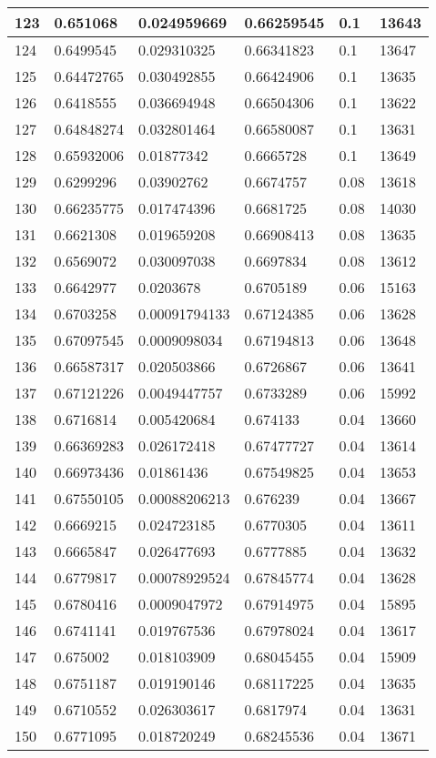 \begin{longtable}{|l|l|l|l|l|l|}
123 & 0.651068 & 0.024959669 & 0.66259545 & 0.1 & 13643 \\ \hline 
124 & 0.6499545 & 0.029310325 & 0.66341823 & 0.1 & 13647 \\ \hline 
125 & 0.64472765 & 0.030492855 & 0.66424906 & 0.1 & 13635 \\ \hline 
126 & 0.6418555 & 0.036694948 & 0.66504306 & 0.1 & 13622 \\ \hline 
127 & 0.64848274 & 0.032801464 & 0.66580087 & 0.1 & 13631 \\ \hline 
128 & 0.65932006 & 0.01877342 & 0.6665728 & 0.1 & 13649 \\ \hline 
129 & 0.6299296 & 0.03902762 & 0.6674757 & 0.08 & 13618 \\ \hline 
130 & 0.66235775 & 0.017474396 & 0.6681725 & 0.08 & 14030 \\ \hline 
131 & 0.6621308 & 0.019659208 & 0.66908413 & 0.08 & 13635 \\ \hline 
132 & 0.6569072 & 0.030097038 & 0.6697834 & 0.08 & 13612 \\ \hline 
133 & 0.6642977 & 0.0203678 & 0.6705189 & 0.06 & 15163 \\ \hline 
134 & 0.6703258 & 0.00091794133 & 0.67124385 & 0.06 & 13628 \\ \hline 
135 & 0.67097545 & 0.0009098034 & 0.67194813 & 0.06 & 13648 \\ \hline 
136 & 0.66587317 & 0.020503866 & 0.6726867 & 0.06 & 13641 \\ \hline 
137 & 0.67121226 & 0.0049447757 & 0.6733289 & 0.06 & 15992 \\ \hline 
138 & 0.6716814 & 0.005420684 & 0.674133 & 0.04 & 13660 \\ \hline 
139 & 0.66369283 & 0.026172418 & 0.67477727 & 0.04 & 13614 \\ \hline 
140 & 0.66973436 & 0.01861436 & 0.67549825 & 0.04 & 13653 \\ \hline 
141 & 0.67550105 & 0.00088206213 & 0.676239 & 0.04 & 13667 \\ \hline 
142 & 0.6669215 & 0.024723185 & 0.6770305 & 0.04 & 13611 \\ \hline 
143 & 0.6665847 & 0.026477693 & 0.6777885 & 0.04 & 13632 \\ \hline 
144 & 0.6779817 & 0.00078929524 & 0.67845774 & 0.04 & 13628 \\ \hline 
145 & 0.6780416 & 0.0009047972 & 0.67914975 & 0.04 & 15895 \\ \hline 
146 & 0.6741141 & 0.019767536 & 0.67978024 & 0.04 & 13617 \\ \hline 
147 & 0.675002 & 0.018103909 & 0.68045455 & 0.04 & 15909 \\ \hline 
148 & 0.6751187 & 0.019190146 & 0.68117225 & 0.04 & 13635 \\ \hline 
149 & 0.6710552 & 0.026303617 & 0.6817974 & 0.04 & 13631 \\ \hline 
150 & 0.6771095 & 0.018720249 & 0.68245536 & 0.04 & 13671 \\ \hline 
\end{longtable}